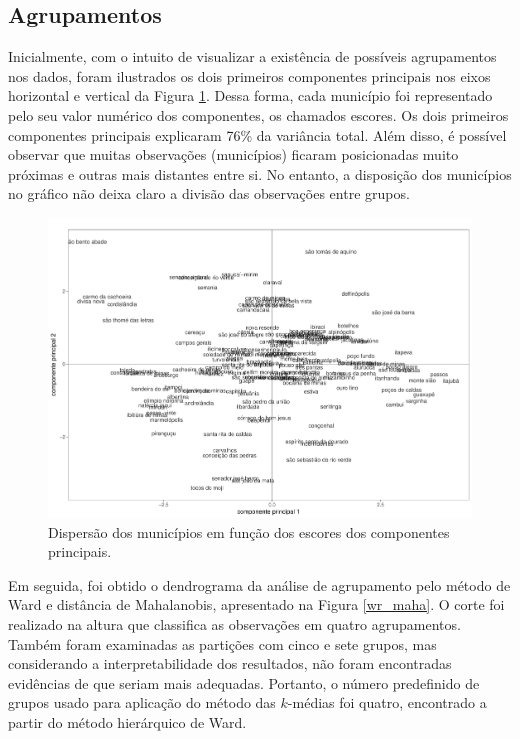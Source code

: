 \documentclass[10pt,twoside]{article}
\begin{document}
\subsection{Agrupamentos}

Inicialmente, com o intuito de visualizar a existência de possíveis agrupamentos nos dados, foram ilustrados os dois primeiros componentes principais nos eixos horizontal e vertical da Figura \ref{cps1}. Dessa forma, cada município foi representado pelo seu valor numérico dos componentes, os chamados escores. Os dois primeiros componentes principais explicaram 76\% da variância total. Além disso, é possível observar que muitas observações (municípios) ficaram posicionadas muito próximas e outras mais distantes entre si. No entanto, a disposição dos municípios no gráfico não deixa claro a divisão das observações entre grupos. 


\begin{figure}[htp!]
\begin{center} 
\includegraphics[scale=0.24]{dispersao_CPs}
\end{center}
\caption{Dispersão dos municípios em função dos escores dos componentes principais.} \label{cps1}
\end{figure}
\FloatBarrier

Em seguida, foi obtido o dendrograma da análise de agrupamento pelo método de Ward e distância de Mahalanobis, apresentado na Figura \ref{wr_maha}. O corte foi realizado na altura que classifica as observações em quatro agrupamentos. Também foram examinadas as partições com cinco e sete grupos, mas considerando a interpretabilidade dos resultados, não foram encontradas evidências de que seriam mais adequadas. Portanto, o número predefinido de grupos usado para aplicação do método das $k$-médias foi quatro, encontrado a partir do método hierárquico de Ward. 
\end{document}
